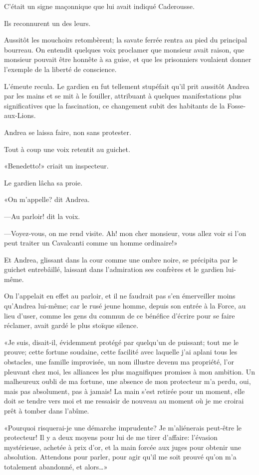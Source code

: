 C'était un signe maçonnique que lui avait indiqué Caderousse. 

Ils reconnurent un des leurs. 

Aussitôt les mouchoirs retombèrent; la savate ferrée rentra au pied du principal bourreau. On entendit quelques voix proclamer que monsieur avait raison, que monsieur pouvait être honnête à sa guise, et que les prisonniers voulaient donner l'exemple de la liberté de conscience. 

L'émeute recula. Le gardien en fut tellement stupéfait qu'il prit aussitôt Andrea par les mains et se mit à le fouiller, attribuant à quelques manifestations plus significatives que la fascination, ce changement subit des habitants de la Fosse-aux-Lions. 

Andrea se laissa faire, non sans protester. 

Tout à coup une voix retentit au guichet. 

«Benedetto!» criait un inspecteur. 

Le gardien lâcha sa proie. 

«On m'appelle? dit Andrea. 

—Au parloir! dit la voix. 

—Voyez-vous, on me rend visite. Ah! mon cher monsieur, vous allez voir si l'on peut traiter un Cavalcanti comme un homme ordinaire!» 

Et Andrea, glissant dans la cour comme une ombre noire, se précipita par le guichet entrebâillé, laissant dans l'admiration ses confrères et le gardien lui-même. 

On l'appelait en effet au parloir, et il ne faudrait pas s'en émerveiller moins qu'Andrea lui-même; car le rusé jeune homme, depuis son entrée à la Force, au lieu d'user, comme les gens du commun de ce bénéfice d'écrire pour se faire réclamer, avait gardé le plus stoïque silence. 

«Je suis, disait-il, évidemment protégé par quelqu'un de puissant; tout me le prouve; cette fortune soudaine, cette facilité avec laquelle j'ai aplani tous les obstacles, une famille improvisée, un nom illustre devenu ma propriété, l'or pleuvant chez moi, les alliances les plus magnifiques promises à mon ambition. Un malheureux oubli de ma fortune, une absence de mon protecteur m'a perdu, oui, mais pas absolument, pas à jamais! La main s'est retirée pour un moment, elle doit se tendre vers moi et me ressaisir de nouveau au moment où je me croirai prêt à tomber dans l'abîme. 

«Pourquoi risquerai-je une démarche imprudente? Je m'aliénerais peut-être le protecteur! Il y a deux moyens pour lui de me tirer d'affaire: l'évasion mystérieuse, achetée à prix d'or, et la main forcée aux juges pour obtenir une absolution. Attendons pour parler, pour agir qu'il me soit prouvé qu'on m'a totalement abandonné, et alors\dots» 

